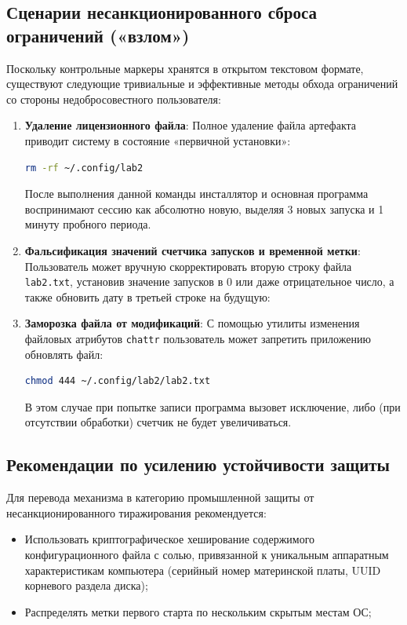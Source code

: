 \documentclass[a4paper]{article}
\begin{document}
\subsection{Сценарии несанкционированного сброса ограничений («взлом»)}
Поскольку контрольные маркеры хранятся в открытом текстовом формате, существуют следующие тривиальные и эффективные методы обхода ограничений со стороны недобросовестного пользователя:

\begin{enumerate}
    \item \textbf{Удаление лицензионного файла}:
          Полное удаление файла артефакта приводит систему в состояние «первичной установки»:
          \begin{lstlisting}[language=bash]
rm -rf ~/.config/lab2
    \end{lstlisting}
          После выполнения данной команды инсталлятор и основная программа воспринимают сессию как абсолютно новую, выделяя 3 новых запуска и 1 минуту пробного периода.

    \item \textbf{Фальсификация значений счетчика запусков и временной метки}:
          Пользователь может вручную скорректировать вторую строку файла \texttt{lab2.txt}, установив значение запусков в 0 или даже отрицательное число, а также обновить дату в третьей строке на будущую:

    \item \textbf{Заморозка файла от модификаций}:
          С помощью утилиты изменения файловых атрибутов \texttt{chattr} пользователь может запретить приложению обновлять файл:
          \begin{lstlisting}[language=bash]
chmod 444 ~/.config/lab2/lab2.txt
    \end{lstlisting}
          В этом случае при попытке записи программа вызовет исключение, либо (при отсутствии обработки) счетчик не будет увеличиваться.
\end{enumerate}

\subsection{Рекомендации по усилению устойчивости защиты}
Для перевода механизма в категорию промышленной защиты от несанкционированного тиражирования рекомендуется:
\begin{itemize}
    \item Использовать криптографическое хеширование содержимого конфигурационного файла с солью, привязанной к уникальным аппаратным характеристикам компьютера (серийный номер материнской платы, UUID корневого раздела диска);
    \item Распределять метки первого старта по нескольким скрытым местам ОС;
\end{itemize}
\end{document}
